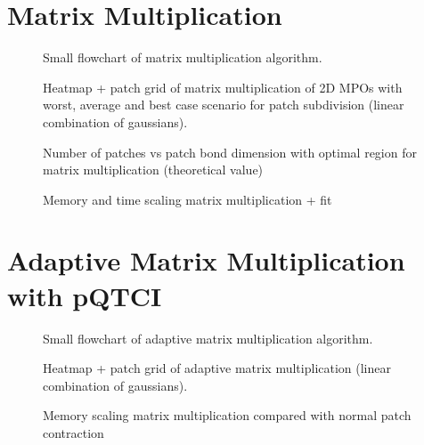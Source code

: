 \section{Matrix Multiplication}

\begin{figure}[ht!]
    \caption{Small flowchart of matrix multiplication algorithm. }
\end{figure}

\begin{figure}[ht!]
    \caption{Heatmap + patch grid of matrix multiplication of 2D MPOs with worst, average and best case scenario for patch subdivision (linear combination of gaussians). }
\end{figure}

\begin{figure}[ht!]
    \caption{Number of patches vs patch bond dimension with optimal region for matrix multiplication (theoretical value) }
\end{figure}

\begin{figure}[ht!]
    \caption{Memory and time scaling matrix multiplication + fit  }
\end{figure}


\section{Adaptive Matrix Multiplication with pQTCI}

\begin{figure}[ht!]
    \caption{Small flowchart of adaptive matrix multiplication algorithm.}
\end{figure}

\begin{figure}[ht!]
    \caption{Heatmap + patch grid of adaptive matrix multiplication (linear combination of gaussians). }
\end{figure}

\begin{figure}[ht!]
    \caption{Memory scaling matrix multiplication compared with normal patch contraction }
\end{figure}


